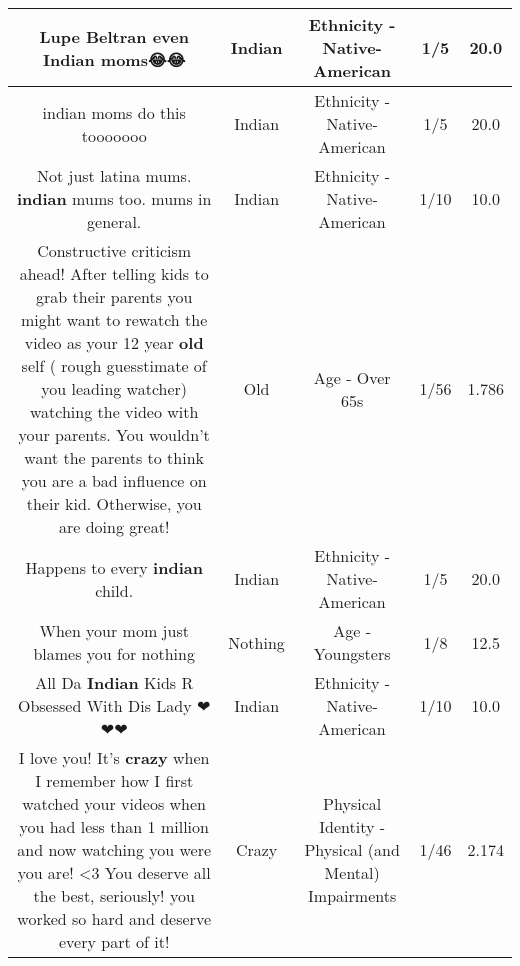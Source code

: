\documentclass[11pt]{article}
\newlength\mylength
\begin{document}
\begin{center}
\begin{longtable}{|C{.65\mylength}|C{.30\mylength}|C{.12\mylength}|C{.12\mylength}|C{.12\mylength}|}
  \small Lupe Beltran even \textbf{Indian} moms😂😂\normalsize   & Indian & Ethnicity - Native-American & 1/5 & 20.0 \\  \hline
  \small indian moms do this tooooooo\normalsize   & Indian & Ethnicity - Native-American & 1/5 & 20.0 \\  \hline
  \small Not just latina mums. \textbf{indian} mums too. mums in general.\normalsize   & Indian & Ethnicity - Native-American & 1/10 & 10.0 \\  \hline
  \small Constructive criticism ahead! After telling kids to grab their parents you might want to rewatch the video as your 12 year \textbf{old} self ( rough guesstimate of you leading watcher) watching the video with your parents. You wouldn't want the parents to think you are a bad influence on their kid. Otherwise, you are doing great!\normalsize   & Old & Age - Over 65s & 1/56 & 1.786 \\  \hline
  \small Happens to every \textbf{indian} child.\normalsize   & Indian & Ethnicity - Native-American & 1/5 & 20.0 \\  \hline
  \small When your mom just blames you for nothing\normalsize   & Nothing & Age - Youngsters & 1/8 & 12.5 \\  \hline
  \small All Da \textbf{Indian} Kids R Obsessed With Dis Lady ❤❤❤\normalsize   & Indian & Ethnicity - Native-American & 1/10 & 10.0 \\  \hline
  \small I love you! It's \textbf{crazy} when I remember how I first watched your videos when you had less than 1 million and now watching you were you are! <3 You deserve all the best, seriously! you worked so hard and deserve every part of it!    \normalsize   & Crazy & Physical Identity - Physical (and Mental) Impairments & 1/46 & 2.174 \\  \hline

\end{longtable}
\end{center}
\end{document}
